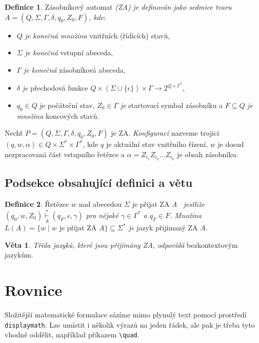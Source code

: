 \documentclass[hidelinks, twocolumn, a4paper, 11pt]{article}
\theoremstyle{definition}
\newtheorem{theorem_def}{Definice}
\newtheorem{theorem_veta}{Věta}
\begin{document}
\begin{theorem_def}
    Zásobníkový automat \textsl{(ZA) je definován jako sedmice tvaru $A = (Q,\Sigma,\Gamma,\delta, q_0, Z_0, F)$, kde}:     

    \begin{itemize}
        \item $Q$ \textsl{je konečná množina} vnitřních (řídicích) stavů, 
        \item $\Sigma$ \textsl{je konečná} vstupní abeceda, 
        \item $\Gamma$ \textsl{je konečná} zásobníková abeceda, 
        \item $\delta$ \textsl{je} přechodová funkce $Q \times (\Sigma \cup \{\epsilon\}) \times \Gamma \rightarrow 2^{Q\times\Gamma^\ast}$,
        \item $q_0 \in Q$ je počáteční stav, $Z_0 \in \Gamma$ \textsl{je} startovací symbol zásobníku a $F \subseteq Q$ \textsl{je množina} koncových stavů. 
    \end{itemize}
\end{theorem_def}


Nechť $P = (Q,\Sigma,\Gamma,\delta, q_0, Z_0, F)$ je ZA. 
\textsl{Konfigurací} nazveme trojici $(q,w,\alpha) \in Q \times \Sigma^\ast \times \Gamma^\ast$, 
kde $q$ je aktuální stav vnitřního řízení, 
$w$ je dosud nezpracovaná část vstupního řetězce a
$\alpha = Z_{i_1}Z_{i_2}\dots Z_{i_k}$ je obsah zásobníku.

\subsection{Podsekce obsahující definici a větu}

\begin{theorem_def}
    Řetězec $w$ nad abecedou $\Sigma$ je přijat ZA \textsl{A~ jestliže $(q_0, w, Z_0) \underset{A}{\overset{*}{\vdash}} (q_F,\epsilon,\gamma)$ 
    pro nějaké $\gamma \in \Gamma^\ast$ a $q_F \in F$. 
    Množina $L(A) = \{ w \mid w \mbox{ je přijat ZA } A \} \subseteq \Sigma^\ast$ je} jazyk přijímaný ZA $A$.
\end{theorem_def}

\begin{theorem_veta}
    \textsl{Třída jazyků, které jsou přijímány ZA, odpovídá} bezkontextovým jazykům.
\end{theorem_veta}

\section{Rovnice}
Složitější matematické formulace sázíme mimo plynulý text pomocí prostředí \verb|displaymath|. 
Lze umístit i několik výrazů na jeden řádek, ale pak je třeba tyto vhodně oddělit, 
například příkazem \verb|\quad|. 
\end{document}
